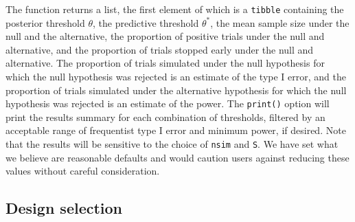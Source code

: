 The function returns a list, the first element of which is a \texttt{tibble} containing the posterior threshold \(\theta\), the predictive threshold \(\theta^*\), the mean sample size under the null and the alternative, the proportion of positive trials under the null and alternative, and the proportion of trials stopped early under the null and alternative. The proportion of trials simulated under the null hypothesis for which the null hypothesis was rejected is an estimate of the type I error, and the proportion of trials simulated under the alternative hypothesis for which the null hypothesis was rejected is an estimate of the power. The \texttt{print()} option will print the results summary for each combination of thresholds, filtered by an acceptable range of frequentist type I error and minimum power, if desired. Note that the results will be sensitive to the choice of \texttt{nsim} and \texttt{S}. We have set what we believe are reasonable defaults and would caution users against reducing these values without careful consideration.

\hypertarget{design-selection}{%
\subsection{Design selection}\label{design-selection}}

